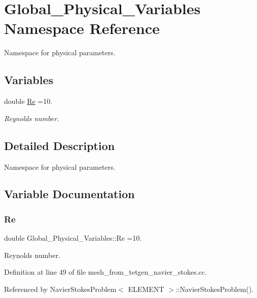 \hypertarget{namespaceGlobal__Physical__Variables}{}\section{Global\+\_\+\+Physical\+\_\+\+Variables Namespace Reference}
\label{namespaceGlobal__Physical__Variables}


Namespace for physical parameters.  


\subsection*{Variables}
\begin{DoxyCompactItemize}
\item 
double \hyperlink{namespaceGlobal__Physical__Variables_ab814e627d2eb5bc50318879d19ab16b9}{Re} =10.
\begin{DoxyCompactList}\small\item\em Reynolds number. \end{DoxyCompactList}\end{DoxyCompactItemize}


\subsection{Detailed Description}
Namespace for physical parameters. 

\subsection{Variable Documentation}
\mbox{\label{namespaceGlobal__Physical__Variables_ab814e627d2eb5bc50318879d19ab16b9}} 
\subsubsection{\texorpdfstring{Re}{Re}}
{\footnotesize\ttfamily double Global\+\_\+\+Physical\+\_\+\+Variables\+::\+Re =10.}



Reynolds number. 



Definition at line 49 of file mesh\+\_\+from\+\_\+tetgen\+\_\+navier\+\_\+stokes.\+cc.



Referenced by Navier\+Stokes\+Problem$<$ E\+L\+E\+M\+E\+N\+T $>$\+::\+Navier\+Stokes\+Problem().

